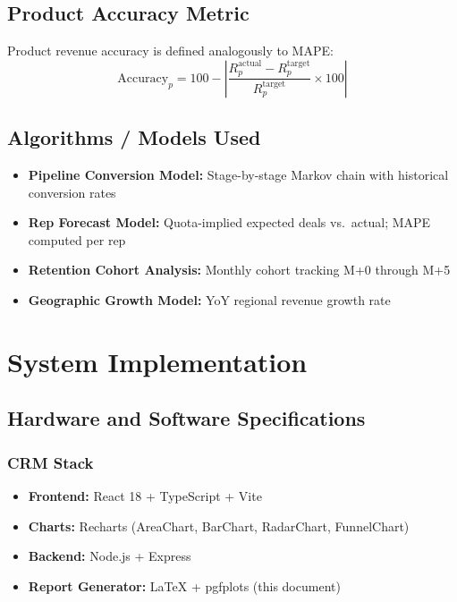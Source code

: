 \documentclass[12pt,a4paper]{report}
\begin{document}
\section{Product Accuracy Metric}

Product revenue accuracy is defined analogously to MAPE:
\[
\text{Accuracy}_{p} = 100 - \left|\frac{R_{p}^{\text{actual}} - R_{p}^{\text{target}}}{R_{p}^{\text{target}}} \times 100\right|
\]

\section{Algorithms / Models Used}

\begin{itemize}[noitemsep]
  \item \textbf{Pipeline Conversion Model:} Stage-by-stage Markov chain with historical conversion rates
  \item \textbf{Rep Forecast Model:} Quota-implied expected deals vs.\ actual; MAPE computed per rep
  \item \textbf{Retention Cohort Analysis:} Monthly cohort tracking M+0 through M+5
  \item \textbf{Geographic Growth Model:} YoY regional revenue growth rate
\end{itemize}

\chapter{System Implementation}

\section{Hardware and Software Specifications}

\subsection{CRM Stack}
\begin{itemize}[noitemsep]
  \item \textbf{Frontend:} React 18 + TypeScript + Vite
  \item \textbf{Charts:} Recharts (AreaChart, BarChart, RadarChart, FunnelChart)
  \item \textbf{Backend:} Node.js + Express
  \item \textbf{Report Generator:} \LaTeX{} + pgfplots (this document)
\end{itemize}
\end{document}
